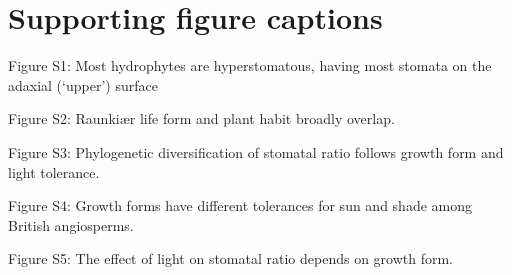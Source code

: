 \documentclass[12pt, oneside]{article}
\begin{document}
\clearpage





\clearpage


\section*{Supporting figure captions}

Figure S1: Most hydrophytes are hyperstomatous, having most stomata on the adaxial (`upper') surface 

Figure S2: Raunki\ae r life form and plant habit broadly overlap.

Figure S3: Phylogenetic diversification of stomatal ratio follows growth form and light tolerance.

Figure S4: Growth forms have different tolerances for sun and shade among British angiosperms.

Figure S5: The effect of light on stomatal ratio depends on growth form.

\clearpage

\end{document}
